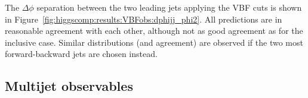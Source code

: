 The $\Delta\phi$ separation between the two leading jets applying the
VBF cuts is shown in
Figure~\ref{fig:higgscomp:results:VBFobs:dphijj_phi2}. All predictions
are in reasonable agreement with each other, although not as good
agreement as for the inclusive case. Similar distributions (and
agreement) are observed if the two most forward-backward jets are
chosen instead.




\clearpage
\subsection{Multijet observables}
\label{sec:hjetscomp:results:mjobs}

